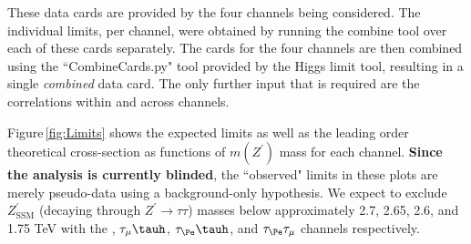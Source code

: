 These data cards are provided by the four channels being considered. 
The individual limits, per channel, were obtained by running the combine tool over each of these cards separately. 
The cards for the four channels are then combined using the ``CombineCards.py" tool provided by the Higgs limit tool, 
resulting in a single \textit{combined} data card. 
The only further input that is required are the correlations within and across channels. 

Figure\,\ref{fig:Limits} shows the expected limits as well as the leading order theoretical cross-section as functions of $m(Z^{\prime})$ mass for each channel. 
\textbf{Since the analysis is currently blinded}, the ``observed" limits in these plots are merely pseudo-data using a background-only hypothesis. 
We expect to exclude $Z^{\prime}_{\textrm{SSM}}$ (decaying through $Z^{\prime}\to\tau\tau$) masses below approximately 2.7, 2.65, 2.6, and 1.75 TeV with the 
\ditauhad, $\tau_{\mu} \tauh$, $\tau_\Pe \tauh$, and $\tau_\Pe \tau_{\mu}$ channels respectively.

